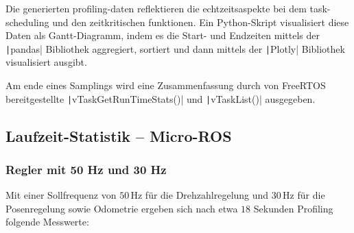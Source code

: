 Die generierten profiling-daten reflektieren die echtzeitsaspekte bei dem
task-scheduling und den zeitkritischen funktionen. Ein Python-Skript
visualisiert diese Daten als Gantt-Diagramm, indem es die Start- und Endzeiten
mittels der \texttt|pandas| Bibliothek aggregiert, sortiert und dann
mittels der \texttt|Plotly| Bibliothek visualisiert ausgibt.

Am ende eines Samplings wird eine Zusammenfassung durch von FreeRTOS
bereitgestellte \texttt|vTaskGetRunTimeStats()| und
\texttt|vTaskList()| ausgegeben.

\subsection{Laufzeit-Statistik -- Micro-ROS}

\subsubsection{Regler mit 50 Hz und 30 Hz}

Mit einer Sollfrequenz von $50\,\text{Hz}$ für die Drehzahlregelung und $30\,\text{Hz}$ für
die Posenregelung sowie Odometrie ergeben sich nach etwa $18$ Sekunden Profiling
folgende Messwerte:

